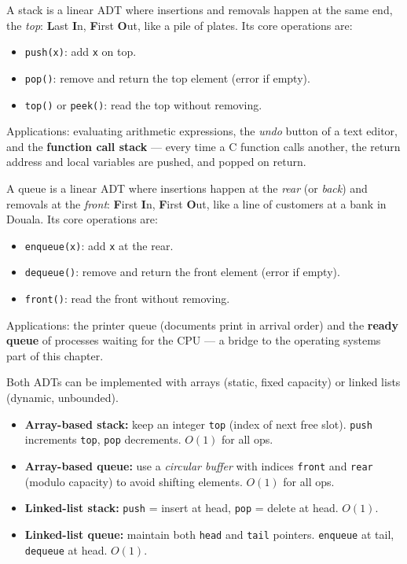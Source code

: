 \documentclass[11pt]{article}
\newcommand{\cle}[1]{{\popxbold\color{popdark}#1}}
\newcounter{popsec}
\newcounter{popsub}
\newcommand{\courssub}[1]{%
  \stepcounter{popsub}%
  \par\vspace{9pt}\noindent{\popxbold\fontsize{11.5}{13}\selectfont\color{popink}{\color{poporange}\thepopsec.\thepopsub}\hspace{6pt}#1}\par\nopagebreak\vspace{4pt}
}
\begin{document}
\courssub{Stacks (LIFO) and Queues (FIFO)}

A \cle{stack} is a linear ADT where insertions and removals happen at the same end, the \emph{top}: \textbf{L}ast \textbf{I}n, \textbf{F}irst \textbf{O}ut, like a pile of plates. Its core operations are:
\begin{itemize}
\item \texttt{push(x)}: add \texttt{x} on top.
\item \texttt{pop()}: remove and return the top element (error if empty).
\item \texttt{top()} or \texttt{peek()}: read the top without removing.
\end{itemize}
Applications: evaluating arithmetic expressions, the \emph{undo} button of a text editor, and the \textbf{function call stack} — every time a C function calls another, the return address and local variables are pushed, and popped on return.

A \cle{queue} is a linear ADT where insertions happen at the \emph{rear} (or \emph{back}) and removals at the \emph{front}: \textbf{F}irst \textbf{I}n, \textbf{F}irst \textbf{O}ut, like a line of customers at a bank in Douala. Its core operations are:
\begin{itemize}
\item \texttt{enqueue(x)}: add \texttt{x} at the rear.
\item \texttt{dequeue()}: remove and return the front element (error if empty).
\item \texttt{front()}: read the front without removing.
\end{itemize}
Applications: the printer queue (documents print in arrival order) and the \textbf{ready queue} of processes waiting for the CPU — a bridge to the operating systems part of this chapter.

\begin{propriete}
Both ADTs can be implemented with arrays (static, fixed capacity) or linked lists (dynamic, unbounded).
\begin{itemize}
\item \textbf{Array-based stack:} keep an integer \texttt{top} (index of next free slot). \texttt{push} increments \texttt{top}, \texttt{pop} decrements. $O(1)$ for all ops.
\item \textbf{Array-based queue:} use a \emph{circular buffer} with indices \texttt{front} and \texttt{rear} (modulo capacity) to avoid shifting elements. $O(1)$ for all ops.
\item \textbf{Linked-list stack:} \texttt{push} = insert at head, \texttt{pop} = delete at head. $O(1)$.
\item \textbf{Linked-list queue:} maintain both \texttt{head} and \texttt{tail} pointers. \texttt{enqueue} at tail, \texttt{dequeue} at head. $O(1)$.
\end{itemize}
\end{propriete}
\end{document}
